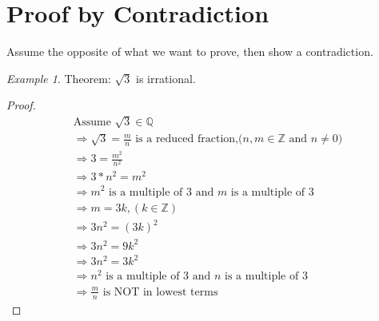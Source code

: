 \documentclass[11pt]{article}
\theoremstyle{remark}
\newtheorem*{example}{Example}
\newcommand{\Z}{\mathbb{Z}}
\begin{document}
	\section{Proof by Contradiction}
	Assume the opposite of what we want to prove, then show a contradiction.
	\begin{example}
		Theorem: $\sqrt{3}$ is irrational.
		\begin{proof}
			\begin{gather}
				\text{Assume $\sqrt{3} \in \mathbb{Q}$} \\
				\Rightarrow \sqrt{3} = \frac{m}{n} \text{ is a reduced fraction,($n, m \in \mathbb{Z}$ and $n \neq 0$)}\\
				\Rightarrow 3 = \frac{m^2}{n^2}\\
				\Rightarrow 3*n^2 = m^2 \\
				\Rightarrow m^2 \text{ is a multiple of $3$ and $m$ is a multiple of $3$} \\
				\Rightarrow m = 3k, (k \in \Z) \\
				\Rightarrow 3n^2 = (3k)^2 \\
				\Rightarrow 3n^2 = 9k^2 \\
				\Rightarrow 3n^2 = 3k^2\\
				\Rightarrow n^2 \text{ is a multiple of $3$ and $n$ is a multiple of $3$}\\
				\Rightarrow \frac{m}{n} \text{ is NOT in lowest terms}
			\end{gather}
		\end{proof}
	\end{example}
	
	
\end{document}
